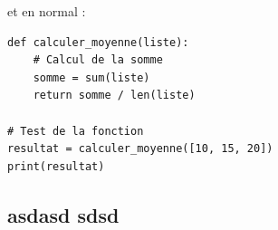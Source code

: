 et en normal :

\begin{lstlisting}
def calculer_moyenne(liste):
    # Calcul de la somme
    somme = sum(liste)
    return somme / len(liste)

# Test de la fonction
resultat = calculer_moyenne([10, 15, 20])
print(resultat)
\end{lstlisting}

\subsection{asdasd sdsd}

\lipsum[2]
